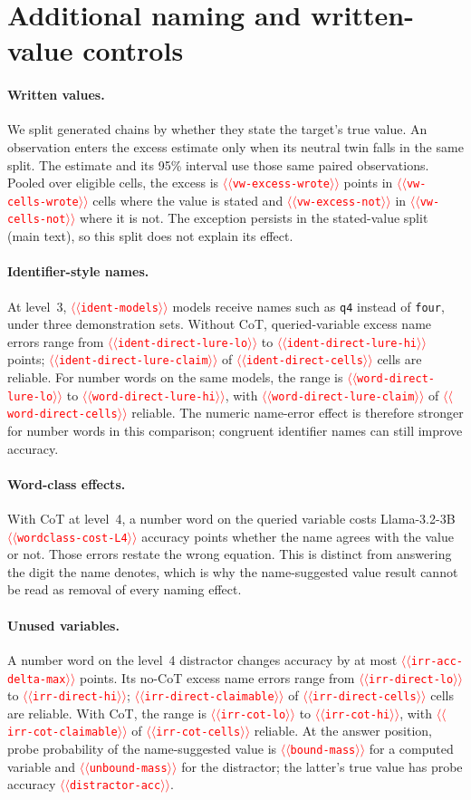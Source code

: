 \documentclass[11pt]{article}
\providecommand{\NUM}[1]{\textcolor{red}{$\langle\langle$\texttt{#1}$\rangle\rangle$}}
\begin{document}
\section{Additional naming and written-value controls}
\label{app:controls}

\paragraph{Written values.} We split generated chains by whether they state the target's true
value. An observation enters the excess estimate only when its neutral twin falls in the same
split. The estimate and its 95\% interval use those same paired observations. Pooled over
eligible cells, the excess is \NUM{vw-excess-wrote} points in \NUM{vw-cells-wrote} cells where
the value is stated and \NUM{vw-excess-not} in \NUM{vw-cells-not} where it is not. The exception
persists in the stated-value split (main text), so this split does not explain its effect.

\paragraph{Identifier-style names.} At level~3, \NUM{ident-models} models receive names such as
\texttt{q4} instead of \texttt{four}, under three demonstration sets. Without CoT, queried-variable
excess name errors range from \NUM{ident-direct-lure-lo} to \NUM{ident-direct-lure-hi} points;
\NUM{ident-direct-lure-claim} of \NUM{ident-direct-cells} cells are reliable. For number words
on the same models, the range is \NUM{word-direct-lure-lo} to \NUM{word-direct-lure-hi}, with
\NUM{word-direct-lure-claim} of \NUM{word-direct-cells} reliable. The numeric name-error effect is
therefore stronger for number words in this comparison; congruent identifier names can still
improve accuracy.

\paragraph{Word-class effects.} With CoT at level~4, a number word on the queried variable costs
Llama-3.2-3B \NUM{wordclass-cost-L4} accuracy points whether the name agrees with the value or
not. Those errors restate the wrong equation. This is distinct from answering the digit the
name denotes, which is why the name-suggested value result cannot be read as removal of every naming effect.

\paragraph{Unused variables.} A number word on the level~4 distractor changes accuracy by at
most \NUM{irr-acc-delta-max} points. Its no-CoT excess name errors range from \NUM{irr-direct-lo} to
\NUM{irr-direct-hi}; \NUM{irr-direct-claimable} of \NUM{irr-direct-cells} cells are reliable.
With CoT, the range is \NUM{irr-cot-lo} to \NUM{irr-cot-hi}, with
\NUM{irr-cot-claimable} of \NUM{irr-cot-cells} reliable. At the answer position, probe probability of the name-suggested value
is \NUM{bound-mass} for a computed variable and \NUM{unbound-mass} for the distractor; the
latter's true value has probe accuracy \NUM{distractor-acc}.
\end{document}
